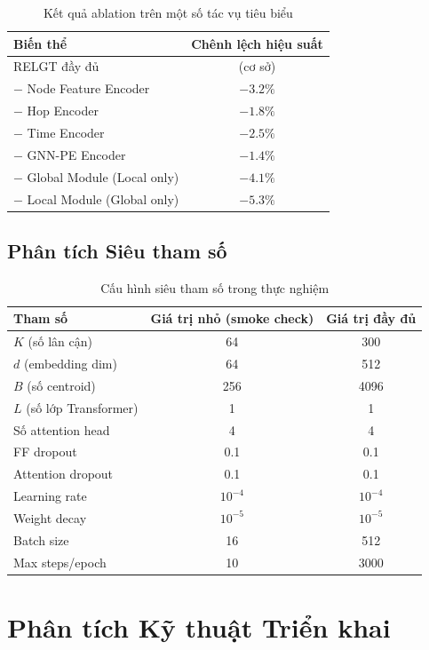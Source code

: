 \documentclass[12pt,a4paper]{article}
\begin{document}
\begin{table}[h!]
\centering
\caption{Kết quả ablation trên một số tác vụ tiêu biểu}
\begin{tabular}{lc}
\toprule
\textbf{Biến thể} & \textbf{Chênh lệch hiệu suất} \\
\midrule
RELGT đầy đủ & (cơ sở) \\
$-$ Node Feature Encoder & $-3.2\%$ \\
$-$ Hop Encoder & $-1.8\%$ \\
$-$ Time Encoder & $-2.5\%$ \\
$-$ GNN-PE Encoder & $-1.4\%$ \\
$-$ Global Module (Local only) & $-4.1\%$ \\
$-$ Local Module (Global only) & $-5.3\%$ \\
\bottomrule
\end{tabular}
\end{table}

\subsection{Phân tích Siêu tham số}

\begin{table}[h!]
\centering
\caption{Cấu hình siêu tham số trong thực nghiệm}
\begin{tabular}{lcc}
\toprule
\textbf{Tham số} & \textbf{Giá trị nhỏ (smoke check)} & \textbf{Giá trị đầy đủ} \\
\midrule
$K$ (số lân cận) & 64 & 300 \\
$d$ (embedding dim) & 64 & 512 \\
$B$ (số centroid) & 256 & 4096 \\
$L$ (số lớp Transformer) & 1 & 1 \\
Số attention head & 4 & 4 \\
FF dropout & 0.1 & 0.1 \\
Attention dropout & 0.1 & 0.1 \\
Learning rate & $10^{-4}$ & $10^{-4}$ \\
Weight decay & $10^{-5}$ & $10^{-5}$ \\
Batch size & 16 & 512 \\
Max steps/epoch & 10 & 3000 \\
\bottomrule
\end{tabular}
\end{table}

\section{Phân tích Kỹ thuật Triển khai}
\end{document}
